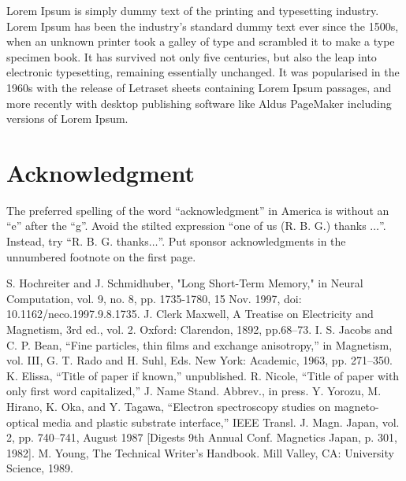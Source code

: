 \documentclass[conference]{IEEEtran}
\begin{document}
Lorem Ipsum is simply dummy text of the printing and typesetting industry. Lorem Ipsum has been the industry's standard dummy text ever since the 1500s, when an unknown printer took a galley of type and scrambled it to make a type specimen book. It has survived not only five centuries, but also the leap into electronic typesetting, remaining essentially unchanged. It was popularised in the 1960s with the release of Letraset sheets containing Lorem Ipsum passages, and more recently with desktop publishing software like Aldus PageMaker including versions of Lorem Ipsum.

\section*{Acknowledgment}

The preferred spelling of the word ``acknowledgment'' in America is without 
an ``e'' after the ``g''. Avoid the stilted expression ``one of us (R. B. 
G.) thanks $\ldots$''. Instead, try ``R. B. G. thanks$\ldots$''. Put sponsor 
acknowledgments in the unnumbered footnote on the first page.

\begin{thebibliography}{00}
 S. Hochreiter and J. Schmidhuber, "Long Short-Term Memory," in Neural Computation, vol. 9, no. 8, pp. 1735-1780, 15 Nov. 1997, doi: 10.1162/neco.1997.9.8.1735. J. Clerk Maxwell, A Treatise on Electricity and Magnetism, 3rd ed., vol. 2. Oxford: Clarendon, 1892, pp.68--73.
 I. S. Jacobs and C. P. Bean, ``Fine particles, thin films and exchange anisotropy,'' in Magnetism, vol. III, G. T. Rado and H. Suhl, Eds. New York: Academic, 1963, pp. 271--350.
 K. Elissa, ``Title of paper if known,'' unpublished.
 R. Nicole, ``Title of paper with only first word capitalized,'' J. Name Stand. Abbrev., in press.
 Y. Yorozu, M. Hirano, K. Oka, and Y. Tagawa, ``Electron spectroscopy studies on magneto-optical media and plastic substrate interface,'' IEEE Transl. J. Magn. Japan, vol. 2, pp. 740--741, August 1987 [Digests 9th Annual Conf. Magnetics Japan, p. 301, 1982].
 M. Young, The Technical Writer's Handbook. Mill Valley, CA: University Science, 1989.
\end{thebibliography}
\vspace{12pt}
\end{document}

